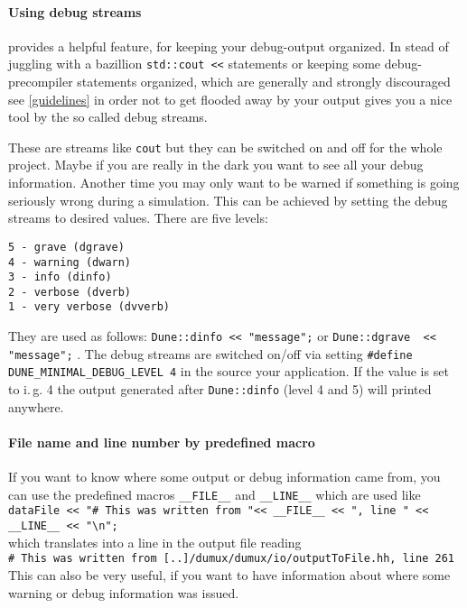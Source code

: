 \paragraph{Using \Dune debug streams}

\Dune provides a helpful feature, for keeping your debug-output organized. 
  In stead of juggling with a bazillion \texttt{std::cout <<} statements or keeping some debug-precompiler statements organized, which are generally and strongly discouraged see \ref{guidelines} in order not to get 
  flooded away by your output \Dune gives you a nice tool by the so called debug streams. 

  These are streams like \texttt{cout} but they can be switched on and off for the whole project. 
  Maybe if you are really in the  dark you want to see all your debug information. Another time you may only want to be warned if something is going seriously wrong during a simulation. 
  This can be achieved by setting the debug streams to desired values. There are five levels:
\begin{verbatim}
5 - grave (dgrave)
4 - warning (dwarn)
3 - info (dinfo)
2 - verbose (dverb)
1 - very verbose (dvverb)
\end{verbatim}

They are used as follows: \lstinline{Dune::dinfo << "message";} or \lstinline{Dune::dgrave  << "message";} .
The debug streams are switched on/off via  setting \lstinline{#define DUNE_MINIMAL_DEBUG_LEVEL 4}
in the source your application. If the value is set to i.\,g. 4 the output generated after \lstinline{Dune::dinfo} (level 4 and 5) will printed anywhere.

\paragraph{File name and line number by predefined macro}

If you want to  know where some output or debug information came from, you can use the predefined macros \lstinline{__FILE__} and \lstinline{__LINE__}
which are used like\\
\lstinline{dataFile << "# This was written from "<< __FILE__ << ", line " << __LINE__ << "\n";}\\
which translates into a line in the output file reading\\
\lstinline{# This was written from [..]/dumux/dumux/io/outputToFile.hh, line 261}\\
This can also be very useful, if you want to have information about where some warning or debug information was issued. 

